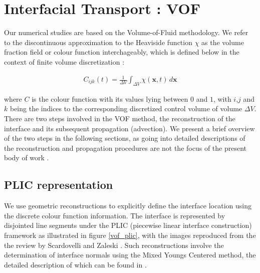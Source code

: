 

\section{Interfacial Transport : VOF}

Our numerical studies are based on the Volume-of-Fluid methodology. 
We refer to the discontinuous approximation to the Heaviside function
$\chi$ as the volume fraction field or colour function interchageably, which 
is defined below in the context of finite volume discretization : 

\begin{align} 
	C_{ijk}\left(t\right) = \frac{1}{\Delta V} \displaystyle\int_{\Delta V} \chi(\boldsymbol{x},t) \,d\boldsymbol x 
\end{align}

where $C$ is the colour function with its values lying between $0$ and $1$, 
with $i$,$j$ and $k$ being the indices to the corresponding discretized control volume of volume $\Delta V$.  
There are two steps involved in the VOF method, the reconstruction of the interface and its 
subsequent propagation (advection). We present a brief overview of the two steps in the following sections,
as going into detailed descriptions of the reconstruction and propagation procedures are 
not the focus of the present body of work .  


\subsection*{PLIC representation}
We use geometric reconstructions to explicitly define the 
interface location using the discrete colour function information. 
The interface is represented by disjointed line segments under 
the PLIC (piecewise linear interface construction)
framework as illustrated in figure \ref{vof_plic}, with the images reproduced 
from the the review by Scardovelli and Zaleski . 
Such reconstructions involve the determination of interface normals 
using the Mixed Youngs Centered method, the detailed description 
of which can be found in \cite{zaleskibook}. 

